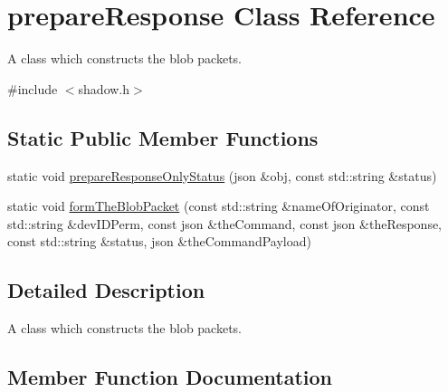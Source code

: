 \hypertarget{classprepareResponse}{}\section{prepare\+Response Class Reference}
\label{classprepareResponse}


A class which constructs the blob packets.  




{\ttfamily \#include $<$shadow.\+h$>$}

\subsection*{Static Public Member Functions}
\begin{DoxyCompactItemize}
\item 
static void \hyperlink{classprepareResponse_a06b9db57d391c2a2e5862319272a4778}{prepare\+Response\+Only\+Status} (json \&obj, const std\+::string \&status)
\item 
static void \hyperlink{classprepareResponse_a2a7ac61625ee38cf510d74de046c0cb8}{form\+The\+Blob\+Packet} (const std\+::string \&name\+Of\+Originator, const std\+::string \&dev\+I\+D\+Perm, const json \&the\+Command, const json \&the\+Response, const std\+::string \&status, json \&the\+Command\+Payload)
\end{DoxyCompactItemize}


\subsection{Detailed Description}
A class which constructs the blob packets. 

\subsection{Member Function Documentation}
